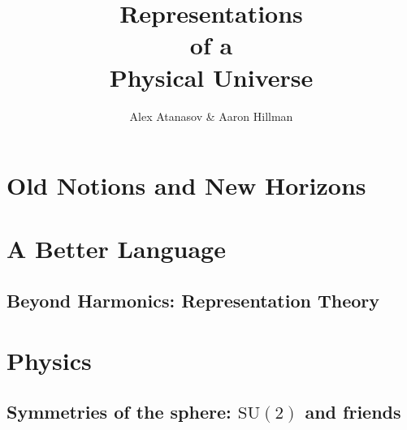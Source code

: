 \documentclass[12pt, twoside, openany]{book}
\title{\textbf{\Huge Representations\\ \large of a\\ \LARGE Physical \LARGE Universe}}
\author{Alex Atanasov \& Aaron Hillman}
\newcommand{\1}{\mathbbm{1}}
\begin{document}
\maketitle
\tableofcontents




	









\part{Old Notions and New Horizons}






\part{A Better Language}



\chapter{Beyond Harmonics: Representation Theory}


\part{Physics}

\chapter{Symmetries of the sphere: $\mathrm{SU}(2)$ and friends}
\end{document}
